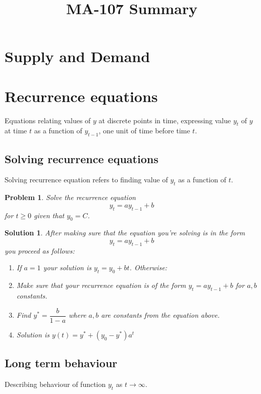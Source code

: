\documentclass[11pt,a4paper, margin]{article}
\theoremstyle{break}
\newtheorem*{problem}{Problem}
\theoremstyle{break}
\newtheorem*{solution}{Solution}
\begin{document}
\title{MA-107 Summary}
\date{}
\maketitle

\section{Supply and Demand}

\section{Recurrence equations}
Equations relating values of $y$ at discrete points in time, expressing value $y_{t}$ of $y$ at time $t$ as a function of $y_{t-1}$, one unit of time before time $t$.

\subsection{Solving recurrence equations}
Solving recurrence equation refers to finding value of $y_{t}$ as a function of ${t}$.
			
\begin{problem}
Solve the recurrence equation \[y_{t} = ay_{t-1} + b\] for $t \geq 0$ given that $y_{0} = C$.
\end{problem}

\begin{solution}
After making sure that the equation you're solving is in the form \[y_{t} = ay_{t-1} + b\] you proceed as follows:
\begin{enumerate}
	\item If $a = 1$ your solution is $y_{t} = y_{0} + bt$. Otherwise:
	\item Make sure that your recurrence equation is of the form $y_{t} = ay_{t-1} + b$ for $a, b$ constants.
	\item Find $y^{\ast} = \dfrac{b}{1-a}$ where $a, b$ are constants from the equation above.
	\item Solution is $y(t) = y^{\ast} + (y_{0} - y^{\ast})a^{t}$
\end{enumerate}
\end{solution}

\subsection{Long term behaviour}
Describing behaviour of function $y_{t}$ as $t \rightarrow \infty$.
\end{document}
